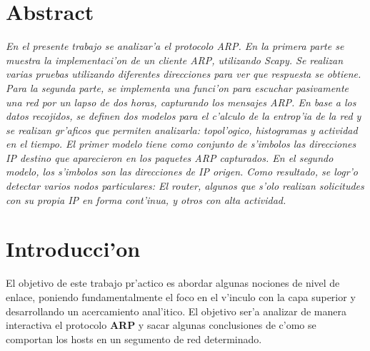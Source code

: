 \documentclass[a4paper,10pt]{article}
\begin{document}

\begin{titlepage}
\maketitle
\thispagestyle{empty}
\end{titlepage} 

\pagebreak
\tableofcontents

\pagebreak
\listoffigures

\pagebreak
\thispagestyle{fancy}

\section*{\centering Abstract}
{\em
En el presente trabajo se analizar'a el protocolo ARP. En la primera parte se muestra la implementaci'on de un cliente ARP, utilizando Scapy. Se realizan varias pruebas utilizando diferentes direcciones para ver que respuesta se obtiene. Para la segunda parte, se implementa una funci'on para escuchar pasivamente una red por un lapso de dos horas, capturando los mensajes ARP. En base a los datos recojidos, se definen dos modelos para el c'alculo de la entrop'ia de la red y se realizan gr'aficos que permiten analizarla: topol'ogico, histogramas y actividad en el tiempo. El primer modelo tiene como conjunto de s'imbolos las direcciones IP destino que aparecieron en los paquetes ARP capturados. En el segundo modelo, los s'imbolos son las direcciones de IP origen. Como resultado, se logr'o detectar varios nodos particulares: El router, algunos que s'olo realizan solicitudes con su propia IP en forma cont'inua, y otros con alta actividad.
}
\vspace*{5 mm}

\section{Introducci'on}
\label{intro1:}

El objetivo de este trabajo pr'actico es abordar algunas nociones de nivel de enlace, poniendo fundamentalmente el foco en el v'inculo con la capa superior y desarrollando un acercamiento anal'itico. El objetivo ser'a analizar de manera interactiva el protocolo \textbf{ARP} y sacar algunas conclusiones de c'omo se comportan los hosts en un segumento de red determinado.
\end{document}
